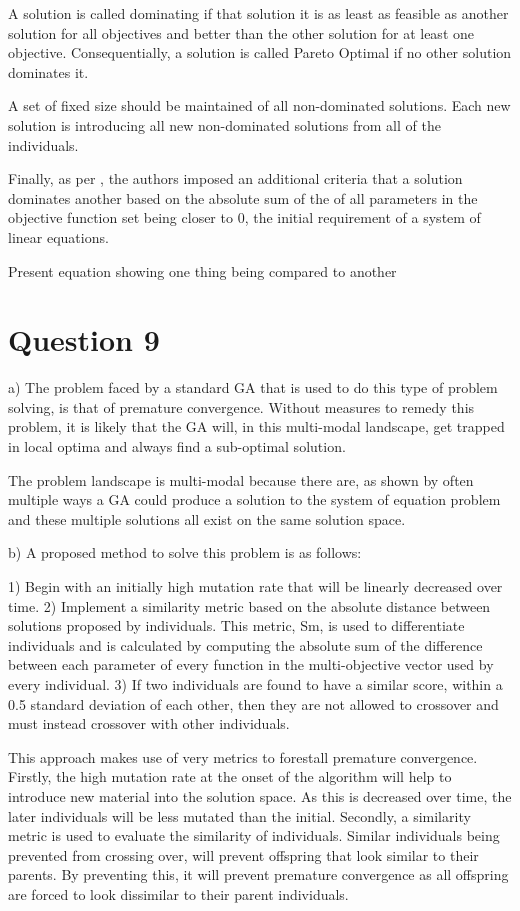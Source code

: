 \documentclass[12pt]{article}
\begin{document}
	A solution is called dominating if that solution it is as least as feasible as another solution for all objectives and better than the other solution for at least one objective. Consequentially, a solution is called Pareto Optimal if no other solution dominates it.

	A set of fixed size should be maintained of all non-dominated solutions. Each new solution is introducing all new non-dominated solutions from all of the individuals. 

	Finally, as per \cite{4490037}, the authors imposed an additional criteria that a solution dominates another based on the absolute sum of the of all parameters in the objective function set being closer to 0, the initial requirement of a system of linear equations.

	{Present equation showing one thing being compared to another}

\section{Question 9}
a)
The problem faced by a standard GA that is used to do this type of problem solving, is that of premature convergence. Without measures to remedy this problem, it is likely that the GA will, in this multi-modal landscape, get trapped in local optima and always find a sub-optimal solution.	

The problem landscape is multi-modal because there are, as shown by \cite{4490037} often multiple ways a GA could produce a solution to the system of equation problem and these multiple solutions all exist on the same solution space.

b) A proposed method to solve this problem is as follows:

	1) Begin with an initially high mutation rate that will be linearly decreased over time.
	2) Implement a similarity metric based on the absolute distance between solutions proposed by individuals. This metric, Sm, is used to differentiate individuals and is calculated by computing the absolute sum of the difference between each parameter of every function in the multi-objective vector used by every individual.
	3) If two individuals are found to have a similar score, within a 0.5 standard deviation of each other, then they are not allowed to crossover and must instead crossover with other individuals.

	This approach makes use of very metrics to forestall premature convergence. Firstly, the high mutation rate at the onset of the algorithm will help to introduce new material into the solution space. As this is decreased over time, the later individuals will be less mutated than the initial. Secondly, a similarity metric is used to evaluate the similarity of individuals. Similar individuals being prevented from crossing over, will prevent offspring that look similar to their parents. By preventing this, it will prevent premature convergence as all offspring are forced to look dissimilar to their parent individuals.
\end{document}
